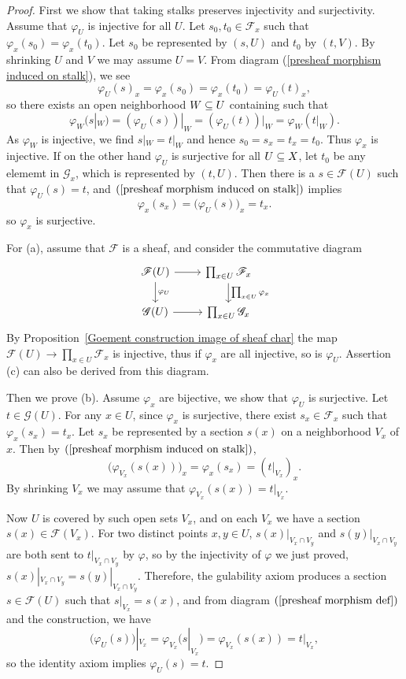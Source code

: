 \begin{proof}
First we show that taking stalks preserves injectivity and surjectivity. Assume that $\varphi_U$ is injective for all $U$. Let $s_0,t_0\in\mathscr{F}_x$ such that $\varphi_x(s_0)=\varphi_x(t_0)$. Let $s_0$ be represented by $(s,U)$ and $t_0$ by $(t,V)$. By shrinking $U$ and $V$ we may assume $U=V$. From diagram (\ref{presheaf morphism induced on stalk}), we see
\[\varphi_U(s)_x=\varphi_x(s_0)=\varphi_x(t_0)=\varphi_U(t)_x,\]
so there exists an open neighborhood $W\subseteq U$ containing such that
\[\varphi_W(s|_W)=(\varphi_U(s))|_W=(\varphi_U(t))|_W=\varphi_W(t|_W).\]
As $\varphi_W$ is injective, we find $s|_W=t|_W$ and hence $s_0=s_x=t_x=t_0$. Thus $\varphi_x$ is injective. If on the other hand $\varphi_U$ is surjective for all $U\subseteq X$, let $t_0$ be any elememt in $\mathscr{G}_x$, which is represented by $(t,U)$. Then there is a $s\in\mathscr{F}(U)$ such that $\varphi_U(s)=t$, and $(\ref{presheaf morphism induced on stalk})$ implies
\[\varphi_x(s_x)=\big(\varphi_U(s)\big)_x=t_x.\]
so $\varphi_x$ is surjective.\par
For (a), assume that $\mathscr{F}$ is a sheaf, and consider the commutative diagram
\[\begin{tikzcd}
\mathscr{F}(U)\ar[r]\ar[d,"\varphi_U"]&\prod_{x\in U}\mathscr{F}_x\ar[d,"\prod_{x\in U}\varphi_x"]\\
\mathscr{G}(U)\ar[r]&\prod_{x\in U}\mathscr{G}_x
\end{tikzcd}\]
By Proposition~\ref{Goement construction image of sheaf char} the map $\mathscr{F}(U)\to\prod_{x\in U}\mathscr{F}_x$ is injective, thus if $\varphi_x$ are all injective, so is $\varphi_U$. Assertion (c) can also be derived from this diagram.\par
Then we prove (b). Assume $\varphi_x$ are bijective, we show that $\varphi_U$ is surjective. Let $t\in\mathscr{G}(U)$. For any $x\in U$, since $\varphi_x$ is surjective, there exist $s_x\in\mathscr{F}_x$ such that $\varphi_x(s_x)=t_x$. Let $s_x$ be represented by a section $s(x)$ on a neighborhood $V_x$ of $x$. Then by $(\ref{presheaf morphism induced on stalk})$,
\[\big(\varphi_{V_x}(s(x))\big)_x=\varphi_x(s_x)=(t|_{V_x})_x.\]
By shrinking $V_x$ we may assume that $\varphi_{V_x}(s(x))=t|_{V_x}$.\par 
Now $U$ is covered by such open sets $V_x$, and on each $V_x$ we have a section $s(x)\in\mathscr{F}(V_x)$. For two distinct points $x,y\in U$, $s(x)|_{V_x\cap V_y}$ and $s(y)|_{V_x\cap V_y}$ are both sent to $t|_{V_x\cap V_y}$ by $\varphi$, so by the injectivity of $\varphi$ we just proved, $s(x)|_{V_x\cap V_y}=s(y)|_{V_x\cap V_y}$. Therefore, the gulability axiom produces a section $s\in\mathscr{F}(U)$ such that $s|_{V_x}=s(x)$, and from diagram $(\ref{presheaf morphism def})$ and the construction, we have
\[\big(\varphi_{U}(s)\big)|_{V_x}=\varphi_{V_x}(s|_{V_x})=\varphi_{V_x}(s(x))=t|_{V_x},\]
so the identity axiom implies $\varphi_U(s)=t$.
\end{proof}
